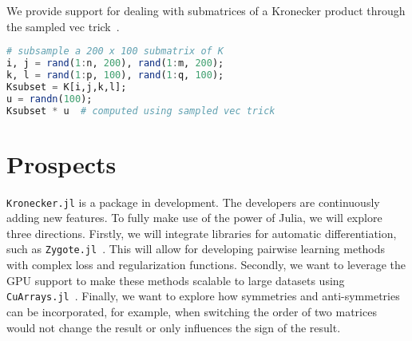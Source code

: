 \documentclass{juliacon}
\begin{document}
We provide support for dealing with submatrices of a Kronecker product through the sampled vec trick~\cite{Airola2017genvectric}.

\begin{lstlisting}[language = Julia]
# subsample a 200 x 100 submatrix of K
i, j = rand(1:n, 200), rand(1:m, 200);
k, l = rand(1:p, 100), rand(1:q, 100);
Ksubset = K[i,j,k,l];
u = randn(100);
Ksubset * u  # computed using sampled vec trick
\end{lstlisting}

\section{Prospects}

\texttt{Kronecker.jl} is a package in development. The developers are continuously adding new features.
To fully make use of the power of Julia, we will explore three directions.
Firstly, we will integrate libraries for automatic differentiation, such as \texttt{Zygote.jl}~\cite{Innes2019}.
This will allow for developing pairwise learning methods with complex loss and regularization functions. Secondly, we want to leverage the GPU support to make these methods scalable to large datasets using \texttt{CuArrays.jl}~\cite{Besard2019}.
Finally, we want to explore how symmetries and anti-symmetries can be incorporated, for example, when switching the order of two matrices would not change the result or only influences the sign of the result.

\end{document}
